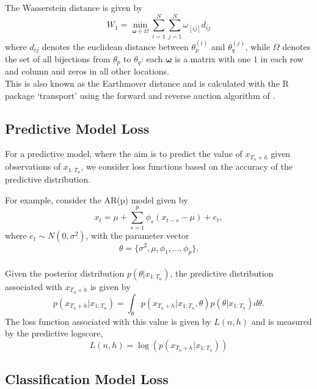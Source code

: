 \documentclass[12pt,a4paper]{article}\usepackage[]{graphicx}\usepackage[]{color}
\begin{document}
The Wasserstein distance is given by
\begin{equation}
\label{wasserstein}
W_1 = \underset{\boldsymbol{\omega} \in \Omega}{\min} \sum_{i=1}^N \sum_{j=1}^N \omega_{[ij]} d_{ij}
\end{equation}
where $d_{ij}$ denotes the euclidean distance between $\theta^{(i)}_p$ and $\theta^{(j)}_q$, while $\Omega$ denotes the set of all bijections from $\theta_p$ to $\theta_q$: each $\boldsymbol{\omega}$ is a matrix with one $1$ in each row and column and zeros in all other locations.
\\

This is also known as the Earthmover distance and is calculated with the R package `transport' \citep{transport} using the forward and reverse auction algorithm of \citet{Bertsekas1992}.

\subsection{Predictive Model Loss}

For a predictive model, where the aim is to predict the value of $x_{T_n + h}$ given observations of $x_{1:T_n}$, we consider loss functions based on the accuracy of the predictive distribution.

For example, consider the AR(p) model given by
\begin{equation}
x_t = \mu + \sum_{s=1}^p \phi_s (x_{t-s} - \mu) + e_t,
\end{equation}
where $e_t \sim N(0, \sigma^2)$, with the parameter vector
\begin{equation}
\theta = \{\sigma^2, \mu, \phi_1, \dots, \phi_p \}.
\end{equation}
\\

Given the posterior distribution $p(\theta | x_{1:T_n})$, the predictive distribution associated with $x_{T_n +h}$ is given by
\begin{equation}
\label{forecastDist}
p(x_{T_n + h} | x_{1:T_n}) = \int_{\theta} p(x_{T_n + h} | x_{1:T_n}, \theta)p(\theta | x_{1:T_n})d\theta.
\end{equation}
The loss function associated with this value is given by $L(n, h)$ and is measured by the predictive logscore,
\begin{equation}
\label{loss:logscore}
L(n, h) = \log(p(x_{T_n + h} | x_{1:T_n}))
\end{equation}

\subsection{Classification Model Loss}
\end{document}
